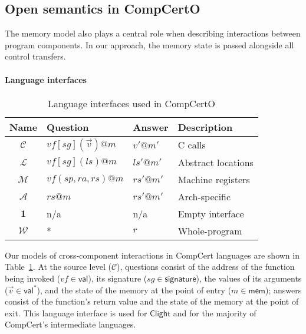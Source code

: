 \documentclass[acmsmall,screen,review,anonymous]{acmart}
\newcommand{\figsize}{\small}
\newcommand{\kw}[1]{\ensuremath{ \mathsf{#1} }}
\begin{document}


\subsection{Open semantics in CompCertO} \label{sec:sem:open} %

The memory model also plays a central role
when describing interactions between program components.
In our approach, %
the memory state is passed %
alongside all control transfers.

\paragraph{Language interfaces} %

\begin{table} %
  \figsize
  \begin{tabular}{clll}
    \hline
    Name & Question & Answer & Description \\
    \hline
    $\mathcal{C}$ &
      $\mathit{vf}[\mathit{sg}](\vec{v})@m$ & $v'@m'$ &
      C calls \\
    $\mathcal{L}$ &
      $\mathit{vf}[\mathit{sg}](\mathit{ls})@m$ & $\mathit{ls}'@m'$ &
      Abstract locations \\
    $\mathcal{M}$ &
      $\mathit{vf}(\mathit{sp},\mathit{ra},\mathit{rs})@m$ & $\mathit{rs}'@m'$ &
      Machine registers \\
    $\mathcal{A}$ &
      $\mathit{rs}@m$ & $\mathit{rs}'@m'$ &
      Arch-specific \\
    $\mathbf{1}$ & n/a & n/a &
      Empty interface \\
    $\mathcal{W}$ & * & $r$ &
      Whole-program \\
    \hline
  \end{tabular}
  \caption{Language interfaces used in CompCertO}
  \label{tbl:li}
\end{table}

Our models of cross-component interactions in CompCert languages
are shown in Table~\ref{tbl:li}.
At the source level ($\mathcal{C}$),
questions consist of
the address of the function being invoked
($\mathit{vf} \in \kw{val}$),
its signature
($\mathit{sg} \in \kw{signature}$),
the values of its arguments
($\vec{v} \in \kw{val}^*$),
and the state of the memory at the point of entry
($m \in \kw{mem}$);
answers
consist of the function's return value
and the state of the memory at the point of exit.
This language interface is used for \kw{Clight} and
for the majority of CompCert's intermediate languages.
\end{document}
